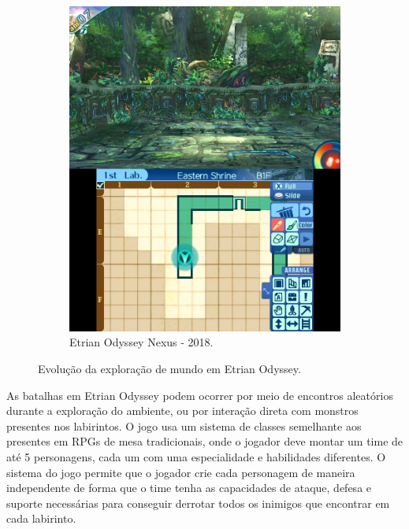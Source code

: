 \documentclass[
	12pt,				%
	openright,			%
	twoside,			%
	a4paper,			%
	english,			%
	french,				%
	spanish,			%
	brazil				%
	]{abntex2}
\begin{document}
\begin{figure}[h!]
\begin{subfigure}[b]{0.44\linewidth}
    \includegraphics[width=\linewidth]{eonexus.jpg}
    \caption{Etrian Odyssey Nexus - 2018.}
  \end{subfigure}
  \caption{Evolução da exploração de mundo em Etrian Odyssey.}
  \label{fig:eo}
\end{figure}

As batalhas em Etrian Odyssey podem ocorrer por meio de encontros aleatórios durante a exploração do ambiente, ou por interação direta com monstros presentes nos labirintos. O jogo usa um sistema de classes semelhante aos presentes em RPGs de mesa tradicionais, onde o jogador deve montar um time de até 5 personagens, cada um com uma especialidade e habilidades diferentes. O sistema do jogo permite que o jogador crie cada personagem de maneira independente de forma que o time tenha as capacidades de ataque, defesa e suporte necessárias para conseguir derrotar todos os inimigos que encontrar em cada labirinto.
\end{document}
